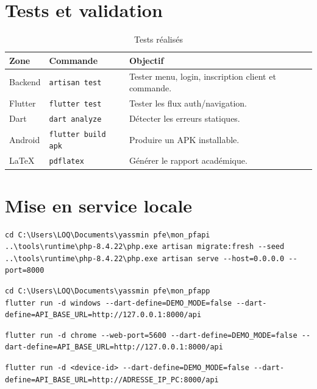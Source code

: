 \documentclass[12pt,a4paper]{report}
\begin{document}
\section{Tests et validation}
\begin{longtable}{p{4cm}p{5cm}p{5cm}}
\caption{Tests réalisés}\\
\toprule
\textbf{Zone} & \textbf{Commande} & \textbf{Objectif}\\
\midrule
Backend & \texttt{artisan test} & Tester menu, login, inscription client et commande.\\
Flutter & \texttt{flutter test} & Tester les flux auth/navigation.\\
Dart & \texttt{dart analyze} & Détecter les erreurs statiques.\\
Android & \texttt{flutter build apk} & Produire un APK installable.\\
LaTeX & \texttt{pdflatex} & Générer le rapport académique.\\
\bottomrule
\end{longtable}

\section{Mise en service locale}
\begin{lstlisting}[style=monpf,caption={Démarrer Laravel}]
cd C:\Users\LOQ\Documents\yassmin pfe\mon_pfapi
..\tools\runtime\php-8.4.22\php.exe artisan migrate:fresh --seed
..\tools\runtime\php-8.4.22\php.exe artisan serve --host=0.0.0.0 --port=8000
\end{lstlisting}

\begin{lstlisting}[style=monpf,caption={Lancer Flutter Windows}]
cd C:\Users\LOQ\Documents\yassmin pfe\mon_pfapp
flutter run -d windows --dart-define=DEMO_MODE=false --dart-define=API_BASE_URL=http://127.0.0.1:8000/api
\end{lstlisting}

\begin{lstlisting}[style=monpf,caption={Lancer Flutter Web}]
flutter run -d chrome --web-port=5600 --dart-define=DEMO_MODE=false --dart-define=API_BASE_URL=http://127.0.0.1:8000/api
\end{lstlisting}

\begin{lstlisting}[style=monpf,caption={Lancer Flutter Android réel}]
flutter run -d <device-id> --dart-define=DEMO_MODE=false --dart-define=API_BASE_URL=http://ADRESSE_IP_PC:8000/api
\end{lstlisting}
\end{document}
